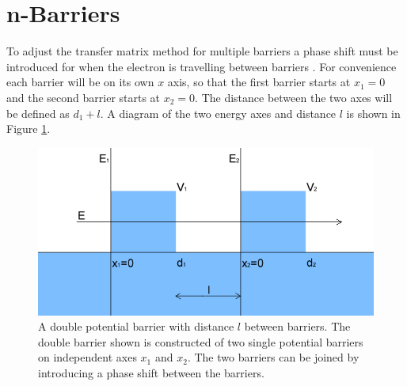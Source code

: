 			\section{n-Barriers}
			\label{Rectangular Barrier - n-Barriers}
				To adjust the transfer matrix method for multiple barriers a phase shift must be introduced for when the electron is travelling between barriers \cite{b18}. For convenience each barrier will be on its own $x$ axis, so that the first barrier starts at $x_{1}=0$ and the second barrier starts at $x_{2}=0$. The distance between the two axes will be defined as $d_{1}+l$. A diagram of the two energy axes and distance $l$ is shown in Figure \ref{n-barriers-x}.
				\begin{figure}[h]
					\centerline{\includegraphics[scale=0.5]{images/multiple-potential-barrier-flat}}
					\caption{A double potential barrier with distance $l$ between barriers. The double barrier shown is constructed of two single potential barriers on independent axes $x_{1}$ and $x_{2}$. The two barriers can be joined by introducing a phase shift between the barriers.}
					\label{n-barriers-x}
				\end{figure}

